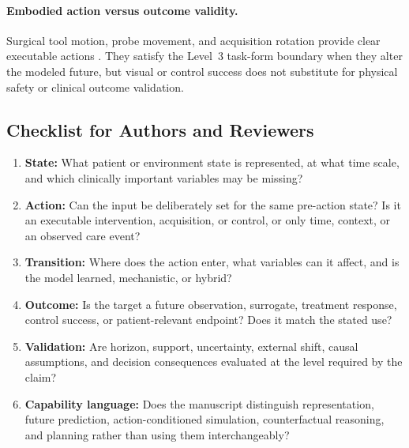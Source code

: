 \paragraph{Embodied action versus outcome validity.} Surgical tool motion, probe movement, and acquisition rotation provide clear executable actions \citep{Sivakumar2026SWoMoNeuroSymbolic,Yue2025EchoWorldLearningMotion,Yang2025Xray2XrayWorldModel}. They satisfy the Level~3 task-form boundary when they alter the modeled future, but visual or control success does not substitute for physical safety or clinical outcome validation.

\subsection{Checklist for Authors and Reviewers}

\begin{enumerate}[leftmargin=*]
\item \textbf{State:} What patient or environment state is represented, at what time scale, and which clinically important variables may be missing?
\item \textbf{Action:} Can the input be deliberately set for the same pre-action state? Is it an executable intervention, acquisition, or control, or only time, context, or an observed care event?
\item \textbf{Transition:} Where does the action enter, what variables can it affect, and is the model learned, mechanistic, or hybrid?
\item \textbf{Outcome:} Is the target a future observation, surrogate, treatment response, control success, or patient-relevant endpoint? Does it match the stated use?
\item \textbf{Validation:} Are horizon, support, uncertainty, external shift, causal assumptions, and decision consequences evaluated at the level required by the claim?
\item \textbf{Capability language:} Does the manuscript distinguish representation, future prediction, action-conditioned simulation, counterfactual reasoning, and planning rather than using them interchangeably?
\end{enumerate}


